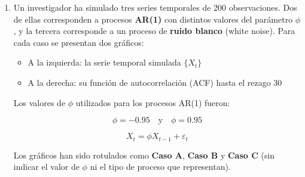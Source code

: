 \documentclass[10pt,a4paper]{article}
\begin{document}
\begin{enumerate}


 \item Un investigador ha simulado tres series temporales de 200 observaciones. Dos de ellas corresponden a procesos \textbf{AR(1)} con distintos valores del parámetro \( \phi \), y la tercera corresponde a un proceso de \textbf{ruido blanco} (white noise). Para cada caso se presentan dos gráficos:

\begin{itemize}
    \item A la izquierda: la serie temporal simulada \( \{X_t\} \)
    \item A la derecha: su función de autocorrelación (ACF) hasta el rezago 30
\end{itemize}

Los valores de \( \phi \) utilizados para los procesos AR(1) fueron:

\[
\phi = -0.95 \quad \text{y} \quad \phi = 0.95
\]

\[
X_t = \phi X_{t-1} + \varepsilon_t
\]

Los gráficos han sido rotulados como \textbf{Caso A}, \textbf{Caso B} y \textbf{Caso C} (sin indicar el valor de \( \phi \) ni el tipo de proceso que representan).


\end{enumerate}
\end{document}
